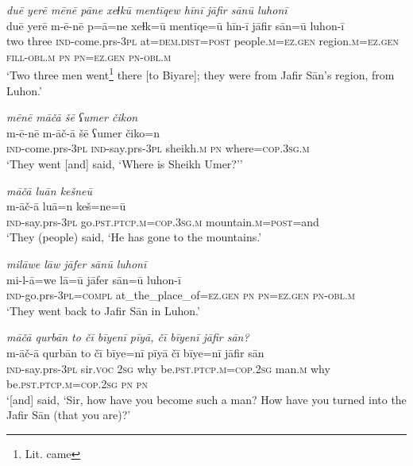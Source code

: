 \ea \label{ŠJ.9}
\textit{duē yerē mēnē pāne xeɫkū mentīqew hīnī jāfir sānū luhonī} \\ 
\gll duē yerē m-ē-nē p=ā=ne xeɫk=ū mentīqe=ū hīn-ī jāfir sān=ū luhon-ī \\ 
 two three \textsc{ind-}come.prs\textsc{-3pl} at=\textsc{dem.dist}\textsc{=\textsc{post}} people\textsc{.m}\textsc{=ez.gen} region\textsc{.m}\textsc{=ez.gen} \textsc{fill}\textsc{-obl}\textsc{.m} \textsc{pn} \textsc{pn}\textsc{=ez.gen} \textsc{pn}\textsc{-obl}\textsc{.m} \\ 
\glt `Two three men went\footnote{Lit. came} there [to Biyare]; they were from Jafir Sān’s region, from Luhon.'
\z 
 
\ea \label{ŠJ.10}
\textit{mēnē māčā šē ʕumer čikon} \\ 
\gll m-ē-nē m-āč-ā šē ʕumer čiko=n \\ 
 \textsc{ind-}come.prs\textsc{-3pl} \textsc{ind-}say.prs\textsc{-3pl} sheikh\textsc{.m} \textsc{pn} where\textsc{=cop}\textsc{.3sg}\textsc{.m} \\ 
\glt `They went [and] said, ‘Where is Sheikh Umer?’'
\z 
 
\ea \label{ŠJ.11}
\textit{māčā luān kešneū} \\ 
\gll m-āč-ā luā=n keš=ne=ū \\ 
 \textsc{ind-}say.prs\textsc{-3pl} go\textsc{.pst}\textsc{.ptcp}\textsc{.m}\textsc{=cop}\textsc{.3sg}\textsc{.m} mountain\textsc{.m}\textsc{=\textsc{post}}=and \\ 
\glt `They (people) said, ‘He has gone to the mountains.'
\z 
 
\ea \label{ŠJ.13}
\textit{milāwe lāw jāfer sānū luhonī} \\ 
\gll mi-l-ā=we lā=ū jāfer sān=ū luhon-ī \\ 
 \textsc{ind-}go.prs\textsc{-3pl}\textsc{=compl} at\_the\_place\_of\textsc{=ez.gen} \textsc{pn} \textsc{pn}\textsc{=ez.gen} \textsc{pn}\textsc{-obl}\textsc{.m} \\ 
\glt `They went back to Jafir Sān in Luhon.'
\z 
 
\ea \label{ŠJ.14}
\textit{māčā qurbān to čī bīyenī pīyā, čī bīyenī jāfir sān?} \\ 
\gll m-āč-ā qurbān to čī bīye=nī pīyā čī bīye=nī jāfir sān \\ 
 \textsc{ind-}say.prs\textsc{-3pl} sir.\textsc{voc} \textsc{2sg} why be\textsc{.pst}\textsc{.ptcp}\textsc{.m}\textsc{=cop}\textsc{.\textsc{2sg}} man\textsc{.m} why be\textsc{.pst}\textsc{.ptcp}\textsc{.m}\textsc{=cop}\textsc{.\textsc{2sg}} \textsc{pn} \textsc{pn} \\ 
\glt `[and] said, ‘Sir, how have you become such a man? How have you turned into the Jafir Sān (that you are)?'
\z 
 
